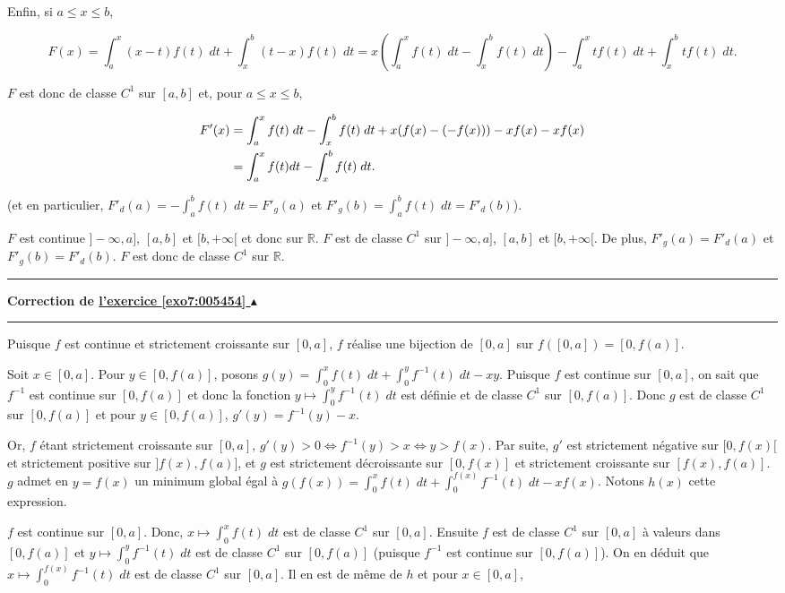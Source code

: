 \documentclass[11pt,a4paper]{article}
\newcommand{\Rr}{\mathbb{R}} \newcommand{\R}{\mathbb{R}}
\newcounter{exo}
\newcommand{\correction}[1]{\hypertarget{cor7:#1}{}\label{cor7:#1}{\bf Correction de \hyperlink{exo7:#1}{l'exercice \ref{exo7:#1} $\blacktriangle$}}\vspace{1mm}\hrule\vspace{1mm}}
\newcommand{\fincorrection}{\vspace{1mm}\hrule\vspace*{7mm}}
\begin{document}
Enfin, si $a\leq x\leq b$, 

$$F(x)=\int_{a}^{x}(x-t)f(t)\;dt+\int_{x}^{b}(t-x)f(t)\;dt=x(\int_{a}^{x}f(t)\;dt-\int_{x}^{b}f(t)\;dt)-\int_{a}^{x}tf(t)\;dt+\int_{x}^{b}tf(t)\;dt.$$

$F$ est donc de classe $C^1$ sur $[a,b]$ et, pour $a\leq x\leq b$, 

\begin{align*}\ensuremath
F'(x)&=\int_{a}^{x}f(t)\;dt-\int_{x}^{b}f(t)\;dt+x(f(x)-(-f(x)))-xf(x)-xf(x)\\
 &=\int_{a}^{x}f(t)dt-\int_{x}^{b}f(t)\;dt.
\end{align*}

(et en particulier, $F'_d(a)=-\int_{a}^{b}f(t)\;dt=F'_g(a)$ et $F'_g(b)=\int_{a}^{b}f(t)\;dt=F'_d(b)$).

$F$ est continue $]-\infty,a]$, $[a,b]$ et $[b,+\infty[$ et donc sur $\Rr$. $F$ est de classe $C^1$ sur $]-\infty,a]$, $[a,b]$ et $[b,+\infty[$. De plus, $F'_g(a)=F'_d(a)$ et $F'_g(b)=F'_d(b)$. $F$ est donc de classe $C^1$ sur $\Rr$.
\fincorrection
\correction{005454}
Puisque $f$ est continue et strictement croissante sur $[0,a]$, $f$ réalise une bijection de $[0,a]$ sur $f([0,a])=[0,f(a)]$.

Soit $x\in[0,a]$. Pour $y\in[0,f(a)]$, posons $g(y)=\int_{0}^{x}f(t)\;dt+\int_{0}^{y}f^{-1}(t)\;dt-xy$. Puisque $f$ est continue sur $[0,a]$, on sait que $f^{-1}$ est continue sur $[0,f(a)]$ et donc la fonction $y\mapsto\int_{0}^{y}f^{-1}(t)\;dt$ est définie et de classe $C^1$ sur $[0,f(a)]$. Donc $g$ est de classe $C^1$ sur 
$[0,f(a)]$ et pour $y\in[0,f(a)]$, $g'(y)=f^{-1}(y)-x$.

Or, $f$ étant strictement croissante sur $[0,a]$, $g'(y)>0\Leftrightarrow f^{-1}(y)>x\Leftrightarrow y>f(x)$. Par suite, $g'$ est strictement négative sur $[0,f(x)[$ et strictement positive sur $]f(x),f(a)]$, et $g$ est strictement décroissante sur $[0,f(x)]$ et strictement croissante sur $[f(x),f(a)]$. $g$ admet en $y=f(x)$ un minimum global égal à
$g(f(x))=\int_{0}^{x}f(t)\;dt+\int_{0}^{f(x)}f^{-1}(t)\;dt-xf(x)$. Notons $h(x)$ cette expression.

$f$ est continue sur $[0,a]$. Donc, $x\mapsto\int_{0}^{x}f(t)\;dt$ est de classe $C^1$ sur $[0,a]$. Ensuite $f$ est de classe $C^1$ sur $[0,a]$ à valeurs dans $[0,f(a)]$ et $y\mapsto\int_{0}^{y}f^{-1}(t)\;dt$ est de classe $C^1$ sur $[0,f(a)]$ (puisque $f^{-1}$ est continue sur $[0,f(a)]$). On en déduit que $x\mapsto\int_{0}^{f(x)}f^{-1}(t)\;dt$ est de classe $C^1$ sur $[0,a]$. Il en est de même de $h$ et pour $x\in[0,a]$,
\end{document}
